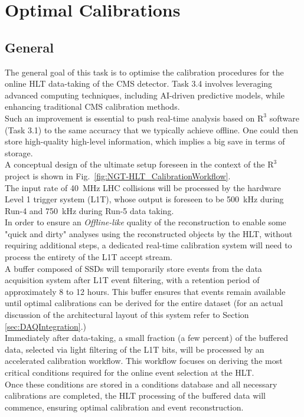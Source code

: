 \chapter{Optimal Calibrations} \label{sec:OpCa_HLT}
\section{General} %

The general goal of this task is to optimise the calibration procedures for the online HLT data-taking of the CMS detector. Task 3.4 involves leveraging advanced computing techniques, including AI-driven predictive models, while enhancing traditional CMS calibration methods. \\
Such an improvement is essential to push real-time analysis based on $\mathrm{R}^3$ software (Task 3.1) to the same accuracy that we typically achieve offline. One could then store high-quality high-level information, which implies a big save in terms of storage.\\
\newline
A conceptual design of the ultimate setup foreseen in the context of the $\mathrm{R}^3$  project is shown in  Fig.~\ref{fig:NGT-HLT_CalibrationWorkflow}. \\
The input rate of \SI{40}{\mega\hertz} LHC collisions will be processed by the hardware Level 1 trigger system (L1T), whose output is foreseen to be \SI{500}{\kilo\hertz} during Run-\num{4} and \SI{750}{\kilo\hertz} during Run-\num{5} data taking. \\
\newline
In order to ensure an \emph{Offline-like} quality of the reconstruction to enable some "quick and dirty" analyses using the reconstructed objects by the HLT, without requiring additional steps, a dedicated real-time calibration system will need to process the entirety of the L1T accept stream.\\  
A buffer composed of SSDs will temporarily store events from the data acquisition system after L1T event filtering, with a retention period of approximately 8 to 12 hours. This buffer ensures that events remain available until optimal calibrations can be derived for the entire dataset (for an actual discussion of the architectural layout of this system refer to Section \ref{sec:DAQIntegration}.)\\
\newline
Immediately after data-taking, a small fraction (a few percent) of the buffered data, selected via light filtering of the L1T bits, will be processed by an accelerated calibration workflow. This workflow focuses on deriving the most critical conditions required for the online event selection at the HLT.\\
Once these conditions are stored in a conditions database and all necessary calibrations are completed, the HLT processing of the buffered data will commence, ensuring optimal calibration and event reconstruction. 

